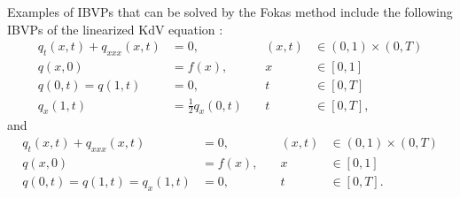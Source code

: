 \documentclass[12pt, oneside, a4paper]{article}
\begin{document}
\noindent Examples of IBVPs that can be solved by the Fokas method include the following IBVPs of the linearized KdV equation \cite{Smith2016}:
\begin{subequations}\label{eq:problem_1}
    \begin{alignat}{3}
        q_t(x,t) + q_{xxx}(x,t) &= 0,\quad &(x,t)&\in (0,1)\times (0,T)\\
        q(x,0) &= f(x),\quad &x&\in [0,1]\\
        q(0,t) = q(1,t) &= 0, \quad &t&\in [0,T]\\
        q_x(1,t) &= \frac{1}{2}q_x(0,t)\quad &t&\in [0,T],
    \end{alignat}
\end{subequations}
and 
\begin{subequations}\label{eq:problem_2}
    \begin{alignat}{3}
        q_t(x,t) + q_{xxx}(x,t) &= 0,\quad &(x,t)&\in (0,1)\times (0,T)\\
        q(x,0) &= f(x),\quad &x&\in [0,1]\\
        q(0,t) = q(1,t) = q_x(1,t) &= 0, \quad &t&\in [0,T].
    \end{alignat}
\end{subequations}
\end{document}
